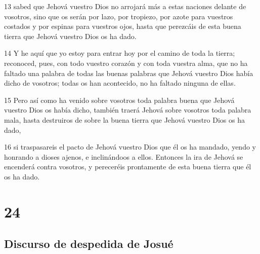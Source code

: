 \par 13 sabed que Jehová vuestro Dios no arrojará más a estas naciones delante de vosotros, sino que os serán por lazo, por tropiezo, por azote para vuestros costados y por espinas para vuestros ojos, hasta que perezcáis de esta buena tierra que Jehová vuestro Dios os ha dado.
\par 14 Y he aquí que yo estoy para entrar hoy por el camino de toda la tierra; reconoced, pues, con todo vuestro corazón y con toda vuestra alma, que no ha faltado una palabra de todas las buenas palabras que Jehová vuestro Dios había dicho de vosotros; todas os han acontecido, no ha faltado ninguna de ellas.
\par 15 Pero así como ha venido sobre vosotros toda palabra buena que Jehová vuestro Dios os había dicho, también traerá Jehová sobre vosotros toda palabra mala, hasta destruiros de sobre la buena tierra que Jehová vuestro Dios os ha dado,
\par 16 si traspasareis el pacto de Jehová vuestro Dios que él os ha mandado, yendo y honrando a dioses ajenos, e inclinándoos a ellos. Entonces la ira de Jehová se encenderá contra vosotros, y pereceréis prontamente de esta buena tierra que él os ha dado.

\chapter{24}

\section*{Discurso de despedida de Josué}

